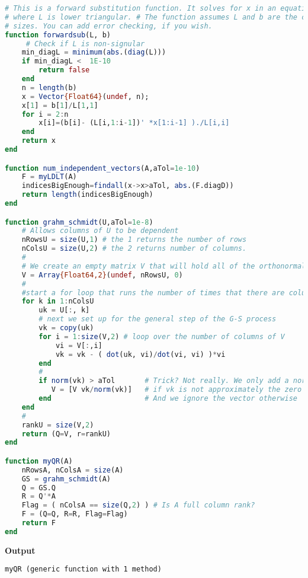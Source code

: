 \begin{lstlisting}[language=Julia,style=mystyle]
# This is a forward substitution function. It solves for x in an equation Lx = b, 
# where L is lower triangular. # The function assumes L and b are the correct 
# sizes. You can add error checking, if you wish.
function forwardsub(L, b)
     # Check if L is non-signular
    min_diagL = minimum(abs.(diag(L)))
    if min_diagL <  1E-10
        return false
    end
    n = length(b)
    x = Vector{Float64}(undef, n); 
    x[1] = b[1]/L[1,1] 
    for i = 2:n 
        x[i]=(b[i]- (L[i,1:i-1])' *x[1:i-1] )./L[i,i] 
    end
    return x
end

function num_independent_vectors(A,aTol=1e-10)
    F = myLDLT(A)
    indicesBigEnough=findall(x->x>aTol, abs.(F.diagD))  
    return length(indicesBigEnough)   
end

function grahm_schmidt(U,aTol=1e-8)
    # Allows columns of U to be dependent
    nRowsU = size(U,1) # the 1 returns the number of rows
    nColsU = size(U,2) # the 2 returns number of columns. 
    #
    # We create an empty matrix V that will hold all of the orthonormal vectors
    V = Array{Float64,2}(undef, nRowsU, 0)
    #
    #start a for loop that runs the number of times that there are columns in U
    for k in 1:nColsU
        uk = U[:, k] 
        # next we set up for the general step of the G-S process
        vk = copy(uk)
        for i = 1:size(V,2) # loop over the number of columns of V
            vi = V[:,i]
            vk = vk - ( dot(uk, vi)/dot(vi, vi) )*vi
        end
        #
        if norm(vk) > aTol       # Trick? Not really. We only add a normalized vk 
           V = [V vk/norm(vk)]   # if vk is not approximately the zero vector. Make sense?
        end                      # And we ignore the vector otherwise
    end
    #
    rankU = size(V,2)
    return (Q=V, r=rankU)
end

function myQR(A)
    nRowsA, nColsA = size(A)
    GS = grahm_schmidt(A)
    Q = GS.Q
    R = Q'*A
    Flag = ( nColsA == size(Q,2) ) # Is A full column rank?
    F = (Q=Q, R=R, Flag=Flag)
    return F
end
\end{lstlisting}
\textbf{Output} 
\begin{verbatim}
myQR (generic function with 1 method)
\end{verbatim}

\vspace*{.2cm}
\begin{center}
\end{center}
\vspace*{.2cm}

